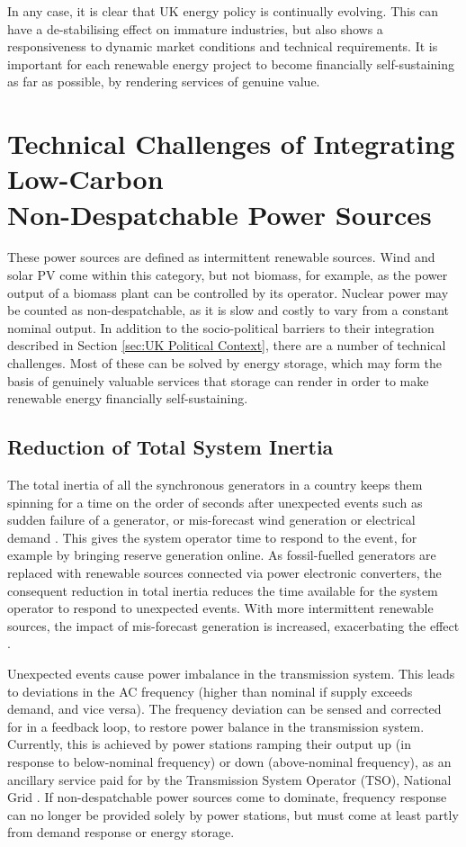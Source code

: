 \documentclass[report_18month.tex]{subfiles}
\begin{document}
In any case, it is clear that UK energy policy is continually evolving. This can have a de-stabilising effect on immature industries, but also shows a responsiveness to dynamic market conditions and technical requirements. It is important for each renewable energy project to become financially self-sustaining as far as possible, by rendering services of genuine value.

\section{Technical Challenges of Integrating Low-Carbon\\ Non-Despatchable Power Sources}
\label{sec:Technical Challenges of Integrating Low-Carbon Non-Despatchable Power Sources}
These power sources are defined as intermittent renewable sources. Wind and solar PV come within this category, but not biomass, for example, as the power output of a biomass plant can be controlled by its operator. Nuclear power may be counted as non-despatchable, as it is slow and costly to vary from a constant nominal output. In addition to the socio-political barriers to their integration described in Section \ref{sec:UK Political Context}, there are a number of technical challenges. Most of these can be solved by energy storage, which may form the basis of genuinely valuable services that storage can render in order to make renewable energy financially self-sustaining.

\subsection{Reduction of Total System Inertia}
\label{sec:Reduction of Total System Inertia}
The total inertia of all the synchronous generators in a country keeps them spinning for a time on the order of seconds after unexpected events such as sudden failure of a generator, or mis-forecast wind generation or electrical demand \citep{kirby2004frequency}. This gives the system operator time to respond to the event, for example by bringing reserve generation online. As fossil-fuelled generators are replaced with renewable sources connected via power electronic converters, the consequent reduction in total inertia reduces the time available for the system operator to respond to unexpected events. With more intermittent renewable sources, the impact of mis-forecast generation is increased, exacerbating the effect \citep{klimstra2014power}.

Unexpected events cause power imbalance in the transmission system. This leads to deviations in the AC frequency (higher than nominal if supply exceeds demand, and vice versa). The frequency deviation can be sensed and corrected for in a feedback loop, to restore power balance in the transmission system. Currently, this is achieved by power stations ramping their output up (in response to below-nominal frequency) or down (above-nominal frequency), as an ancillary service paid for by the Transmission System Operator (TSO), National Grid \citep{natgrid2013ffr}. If non-despatchable power sources come to dominate, frequency response can no longer be provided solely by power stations, but must come at least partly from demand response or energy storage.
\end{document}
